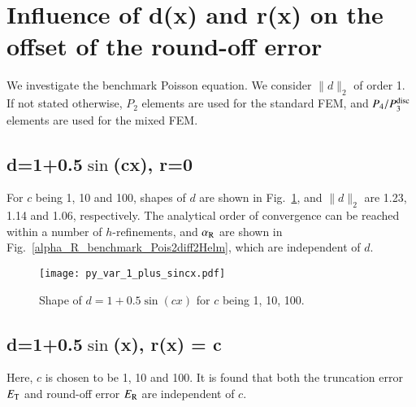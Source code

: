 \documentclass[review,3p]{elsarticle}
\begin{document}
\section{Influence of d(x) and r(x) on the offset of the round-off error}         \label{discretization_error_bench_pois_diff_Helm}


We investigate the benchmark Poisson equation.
We consider $\|d\|_2$ of order 1\cite{chernetsky2010effect}.
If not stated otherwise, $P_2$ elements are used for the standard FEM, and $P_4/P_3^{\rm disc}$ elements are used for the mixed FEM.


\subsection{d=1+0.5\texorpdfstring{$\sin$(cx)}{sin(cx)}, r=0}            \label{p_exp_d_1plus0p5sincx_r_0}

For $c$ being 1, 10 and 100, shapes of $d$ are shown in Fig.~\ref{shape_1_plus_sincx}, and $\|d\|_2$ are 1.23, 1.14 and 1.06, respectively. 
The analytical order of convergence can be reached within a number of $h$-refinements, and $\alpha_{\rm R}$ are shown in Fig.~\ref{alpha_R_benchmark_Pois2diff2Helm}, which are independent of $d$.

 \begin{figure}[!ht]
 \centering
     \texttt{[image: py\_var\_1\_plus\_sincx.pdf]}
     \caption{Shape of $d=1+0.5\sin(cx)$ for $c$ being 1, 10, 100.}
     \label{shape_1_plus_sincx}
 \end{figure}
 
\subsection{d=1+0.5\texorpdfstring{$\sin$(x)}{sin(x)}, r(x) = c}

Here, $c$ is chosen to be 1, 10 and 100. 
It is found that both the truncation error $E_{\rm T}$ and round-off error $E_{\rm R}$ are independent of $c$.
 
\end{document}
